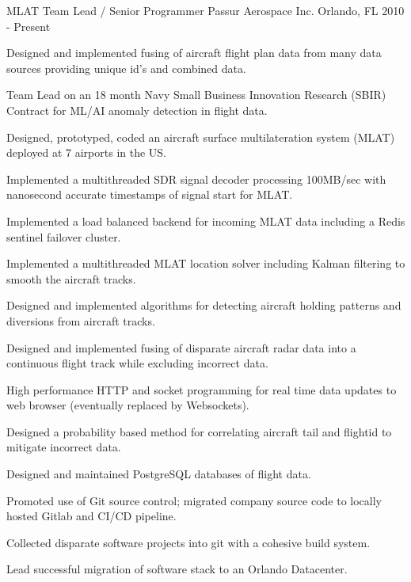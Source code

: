 

\begin{cventries}

  \cventry
    {MLAT Team Lead / Senior Programmer} %
    {Passur Aerospace Inc.} %
    {Orlando, FL} %
    {2010 - Present} %
    {
      \begin{cvitems} %
        \item {Designed and implemented fusing of aircraft flight plan data from many data sources providing unique id's and combined data.}
        \item {Team Lead on an 18 month Navy Small Business Innovation Research (SBIR) Contract for ML/AI anomaly detection in flight data.}
        \item {Designed, prototyped, coded an aircraft surface multilateration system (MLAT) deployed at 7 airports in the US.}
        \item {Implemented a multithreaded SDR signal decoder processing 100MB/sec with nanosecond accurate timestamps of signal start for MLAT.}
        \item {Implemented a load balanced backend for incoming MLAT data including a Redis sentinel failover cluster.}
        \item {Implemented a multithreaded MLAT location solver including Kalman filtering to smooth the aircraft tracks.}
        \item {Designed and implemented algorithms for detecting aircraft holding patterns and diversions from aircraft tracks.}
        \item {Designed and implemented fusing of disparate aircraft radar data into a continuous flight track while excluding incorrect data.}
        \item {High performance HTTP and socket programming for real time data updates to web browser (eventually replaced by Websockets).}
        \item {Designed a probability based method for correlating aircraft tail and flightid to mitigate incorrect data.}
        \item {Designed and maintained PostgreSQL databases of flight data.}
        \item {Promoted use of Git source control; migrated company source code to locally hosted Gitlab and CI/CD pipeline.}
        \item {Collected disparate software projects into git with a cohesive build system.}
        \item {Lead successful migration of software stack to an Orlando Datacenter.}
      \end{cvitems}
    }


\end{cventries}
